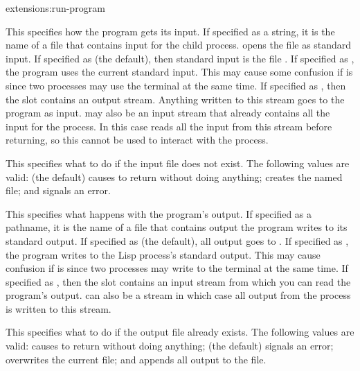 \begin{defun}{extensions:}{run-program}
\begin{Lentry}
  \item[\kwd{input}] This specifies how the program gets its input.
    If specified as a string, it is the name of a file that contains
    input for the child process.   opens the file as
    standard input.  If specified as \nil{} (the default), then
    standard input is the file .  If specified as
    \true, the program uses the current standard input.  This may
    cause some confusion if  is \nil{} since two processes
    may use the terminal at the same time.  If specified as
    , then the  slot contains an
    output stream.  Anything written to this stream goes to the
    program as input.   may also be an input stream that
    already contains all the input for the process.  In this case
     reads all the input from this stream before
    returning, so this cannot be used to interact with the process.
    
  \item[\kwd{if-input-does-not-exist}] This specifies what to do if
    the input file does not exist.  The following values are valid:
    \nil{} (the default) causes  to return \nil{}
    without doing anything;  creates the named file; and
     signals an error.
    
  \item[\kwd{output}] This specifies what happens with the program's
    output.  If specified as a pathname, it is the name of a file that
    contains output the program writes to its standard output.  If
    specified as \nil{} (the default), all output goes to
    .  If specified as \true, the program writes to
    the Lisp process's standard output.  This may cause confusion if
     is \nil{} since two processes may write to the terminal
    at the same time.  If specified as , then the
     slot contains an input stream from which you
    can read the program's output.   can also be a stream
    in which case all output from the process is written to this
    stream. 
    
  \item[\kwd{if-output-exists}] This specifies what to do if the
    output file already exists.  The following values are valid:
    \nil{} causes  to return \nil{} without doing
    anything;  (the default) signals an error;
     overwrites the current file; and 
    appends all output to the file.
    

\end{Lentry}
\end{defun}
